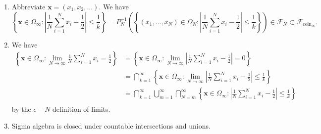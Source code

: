\documentclass{article}
\begin{document}
\begin{enumerate}[label=(\roman*)]
    \item Abbreviate $\mathbf{x} = (x_1,x_2,\dots)$. We have 
        $$
        \left\{ \mathbf{x} \in \Omega_\infty : 
        \left| \frac{1}{N}\sum_{i=1}^N x_i - \frac{1}{2} \right| \leq \frac{1}{k}\right\} 
        = P_N^{-1}\left( \left\{ (x_1,\dots,x_N) \in \Omega_N : 
        \left| \frac{1}{N}\sum_{i=1}^N x_i - \frac{1}{2} \right| \leq \frac{1}{k}\right\} \right) 
        \in \mathcal{F}_N \subset \mathcal{F}_{\textrm{coin}_\infty}.
        $$
    \item We have  
        \begin{align*}
        \left\{ \mathbf{x} \in \Omega_\infty : 
        \lim_{N \to \infty} \frac{1}{N}\sum_{i=1}^N x_i = \frac{1}{2} \right\} &= 
        \left\{ \mathbf{x} \in \Omega_\infty : 
        \lim_{N \to \infty} \left| \frac{1}{N}\sum_{i=1}^N x_i - \frac{1}{2} \right| = 0\right\}\\ 
        &= 
        \bigcap_{k=1}^\infty \left\{ \mathbf{x} \in \Omega_\infty : 
        \lim_{N \to \infty} \left| \frac{1}{N}\sum_{i=1}^N x_i - \frac{1}{2} \right| \leq \frac{1}{k}\right\}\\ 
        &= 
        \bigcap_{k=1}^\infty \bigcup_{m=1}^\infty \bigcap_{N=m}^\infty \left\{ \mathbf{x} \in \Omega_\infty : 
        \left| \frac{1}{N}\sum_{i=1}^N x_i - \frac{1}{2} \right| \leq \frac{1}{k}\right\}\\ 
        \end{align*} 
    by the $\epsilon-N$ definition of limits. 
    \item Sigma algebra is closed under countable intersections and unions. 
\end{enumerate}
\end{document}
